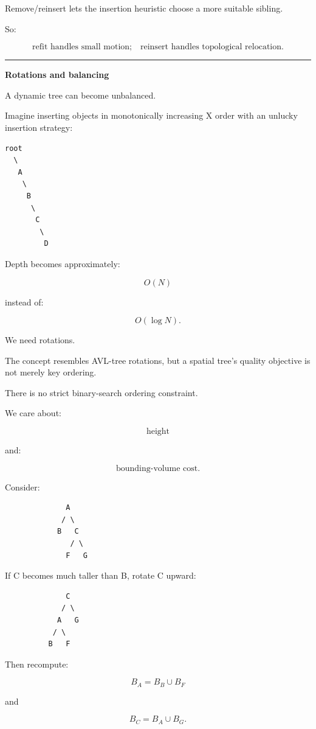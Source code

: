 Remove/reinsert lets the insertion heuristic choose a more suitable sibling.

So:

\[
\boxed{
\text{refit handles small motion;}
\quad
\text{reinsert handles topological relocation.}
}
\]

\begin{center}\rule{0.5\linewidth}{0.5pt}\end{center}

\textbf{Rotations and balancing}

A dynamic tree can become unbalanced.

Imagine inserting objects in monotonically increasing X order with an unlucky insertion strategy:

\begin{verbatim}
root
  \
   A
    \
     B
      \
       C
        \
         D
\end{verbatim}

Depth becomes approximately:

\[
O(N)
\]

instead of:

\[
O(\log N).
\]

We need rotations.

The concept resembles AVL-tree rotations, but a spatial tree's quality objective is not merely key ordering.

There is no strict binary-search ordering constraint.

We care about:

\[
\text{height}
\]

and:

\[
\text{bounding-volume cost}.
\]

Consider:

\begin{verbatim}
              A
             / \
            B   C
               / \
              F   G
\end{verbatim}

If C becomes much taller than B, rotate C upward:

\begin{verbatim}
              C
             / \
            A   G
           / \
          B   F
\end{verbatim}

Then recompute:

\[
B_A=B_B\cup B_F
\]

and

\[
B_C=B_A\cup B_G.
\]

